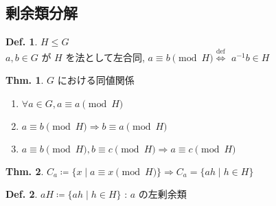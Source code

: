\documentclass[uplatex,dvipdfmx,9pt]{beamer}
\newcommand{\defarrow}{\overset{\mathrm{def}}{\Leftrightarrow}}
\newcounter{textExmCount}
\theoremstyle{definition} %
\newtheorem{defn}{Def.}[subsection] %
\newtheorem{thm}{Thm.}[subsection] %
\theoremstyle{example}
\begin{document}
    \subsection{\textsection \thesubsection 剰余類分解}
    \setcounter{textExmCount}{0}

      \begin{frame}
        
        \begin{defn}
          $H \le G$ \\
          $a,b \in G$ が $H$ を\alert{法}として\alert{左合同}, $a \equiv b \pmod{H}$$\defarrow$ $a^{-1}b \in H$ 
        \end{defn}

        \begin{thm}
          $G$ における同値関係
          \begin{enumerate}
            \item $\forall a \in G, a \equiv a \pmod{H}$
            \item $a \equiv b \pmod{H} \Rightarrow b \equiv a \pmod{H}$
            \item $a \equiv b \pmod{H}, b \equiv c \pmod{H} \Rightarrow a \equiv c \pmod{H}$
          \end{enumerate}
        \end{thm}

        \begin{thm}
          $C_a \coloneqq \{x \mid a \equiv x \pmod{H}\} \Rightarrow C_a = \{ah \mid h \in H\}$ \\
        \end{thm}

        \begin{defn}
          $aH \coloneqq \{ah \mid h \in H\}$ : $a$ の\alert{左剰余類}
        \end{defn}

      \end{frame}
\end{document}
